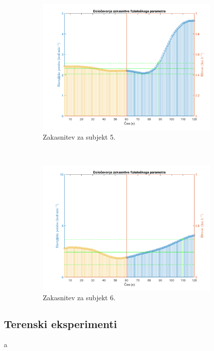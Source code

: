 \begin{figure}[!htbp]
\begin{subfigure}[t]{0.45\columnwidth}
		\includegraphics[width=\columnwidth]{./Slike/lag-estimation-5-eem.png}
		\caption{Zakasnitev za subjekt 5.}
		\label{fig:lag-estimation-5-eem}
	\end{subfigure}
	~
	\begin{subfigure}[t]{0.45\columnwidth}
		\includegraphics[width=\columnwidth]{./Slike/lag-estimation-6-eem.png}
		\caption{Zakasnitev za subjekt 6.}
		\label{fig:lag-estimation-6-eem}
	\end{subfigure}
	\caption{}
	\label{fig:lag-estimation-stage2}
\end{figure}

\subsection{Terenski eksperimenti}
a
